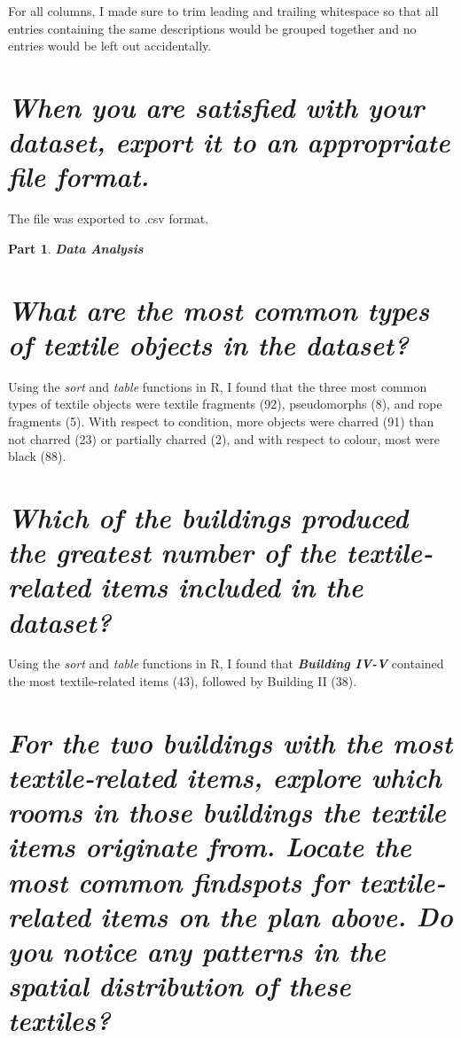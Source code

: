 \documentclass[answers]{exam}
\newtheorem{problem}{Part}
\begin{document}
\begin{parts}
\quad\quad For all columns, I made sure to trim leading and trailing whitespace so that all entries containing the same descriptions would be grouped together and no entries would be left out accidentally.

\color{black}\part{\textit{When you are satisfied with your dataset, export it to an appropriate file format.}}

\color{nr}\quad\quad The file was exported to .csv format.
\end{parts}

\color{black}
\begin{problem}
\textbf{Data Analysis}
\end{problem}
\begin{parts}
    \part{\textit{What are the most common types of textile objects in the dataset?}}

    \color{nr}\quad\quad Using the \textit{sort} and \textit{table} functions in R, I found that the three most common types of textile objects were textile fragments (92), pseudomorphs (8), and rope fragments (5). With respect to condition, more objects were charred (91) than not charred (23) or partially charred (2), and with respect to colour, most were black (88).

    \color{black}\part{\textit{Which of the buildings produced the greatest number of the textile‐related items included in the dataset?}}

\color{nr}\quad\quad Using the \textit{sort} and \textit{table} functions in R, I found that \textbf{\textit{Building IV-V}} contained the most textile-related items (43), followed by Building II (38).

\color{black}\part{\textit{For the two buildings with the most textile‐related items, explore which rooms in those
buildings the textile items originate from. Locate the most common findspots for textile‐related
items on the plan above. Do you notice any patterns in the spatial distribution of these textiles?}}


\end{parts}
\end{document}

